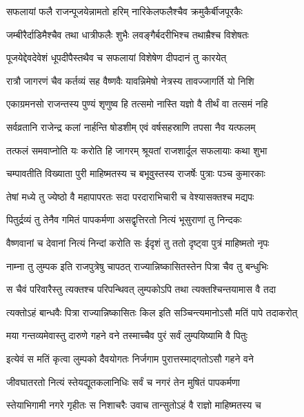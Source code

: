 \twolineshloka
{सफलायां फलै राजन्पूजयेन्नामतो हरिम्}
{नारिकेलफलैश्चैव क्रमुकैर्बीजपूरकैः}%

\twolineshloka
{जम्बीरैर्दाडिमैश्चैव तथा धात्रीफलैः शुभैः}
{लवङ्गैर्बदरीभिश्च तथाम्रैश्च विशेषतः}%

\twolineshloka
{पूजयेद्देवदेवेशं धूपदीपैस्तथैव च}
{सफलायां विशेषेण दीपदानं तु कारयेत्}%

\twolineshloka
{रात्रौ जागरणं चैव कर्तव्यं सह वैष्णवैः}
{यावन्निमेषो नेत्रस्य तावज्जागर्ति यो निशि}%

\twolineshloka
{एकाग्रमनसो राजन्तस्य पुण्यं शृणुष्व हि}
{तत्समो नास्ति यज्ञो वै तीर्थं वा तत्समं नहि}%

\twolineshloka
{सर्वव्रतानि राजेन्द्र कलां नार्हन्ति षोडशीम्}
{एवं वर्षसहस्राणि तपसा नैव यत्फलम्}%

\twolineshloka
{तत्फलं समवाप्नोति यः करोति हि जागरम्}
{श्रूयतां राजशार्दूल सफलायाः कथा शुभा}%

\twolineshloka
{चम्पावतीति विख्याता पुरी माहिष्मतस्य च}
{बभूवुस्तस्य राजर्षेः पुत्राः पञ्च कुमारकाः}%

\twolineshloka
{तेषां मध्ये तु ज्येष्ठो वै महापापरतः सदा}
{परदाराभिचारी च वेश्यासक्तश्च मद्यपः}%

\twolineshloka
{पितुर्द्रव्यं तु तेनैव गमितं पापकर्मणा}
{असद्वृत्तिरतो नित्यं भूसुराणां तु निन्दकः}%

\twolineshloka
{वैष्णवानां च देवानां नित्यं निन्दां करोति सः}
{ईदृशं तु ततो दृष्ट्वा पुत्रं माहिष्मतो नृपः}%

\twolineshloka
{नाम्ना तु लुम्पक इति राजपुत्रेषु चापठत्}
{राज्यान्निष्कासितस्तेन पित्रा चैव तु बन्धुभिः}%

\twolineshloka
{स चैवं परिवारैस्तु त्यक्तश्च परिपन्थिवत्}
{लुम्पकोऽपि तथा त्यक्तश्चिन्तयामास वै तदा}%

\twolineshloka
{त्यक्तोऽहं बान्धवैः पित्रा राज्यान्निष्कासितः किल}
{इति सञ्चिन्त्यमानोऽसौ मतिं पापे तदाकरोत्}%

\twolineshloka
{मया गन्तव्यमेवास्तु दारुणे गहने वने}
{तस्माच्चैव पुरं सर्वं लुम्पयिष्यामि वै पितुः}%

\twolineshloka
{इत्येवं स मतिं कृत्वा लुम्पको दैवयोगतः}
{निर्जगाम पुरात्तस्माद्गतोऽसौ गहने वने}%

\twolineshloka
{जीवघातरतो नित्यं स्तेयद्यूतकलानिधिः}
{सर्वं च नगरं तेन मुषितं पापकर्मणा}%

\twolineshloka
{स्तेयाभिगामी नगरे गृहीतः स निशाचरैः}
{उवाच तान्सुतोऽहं वै राज्ञो माहिष्मतस्य च}%

